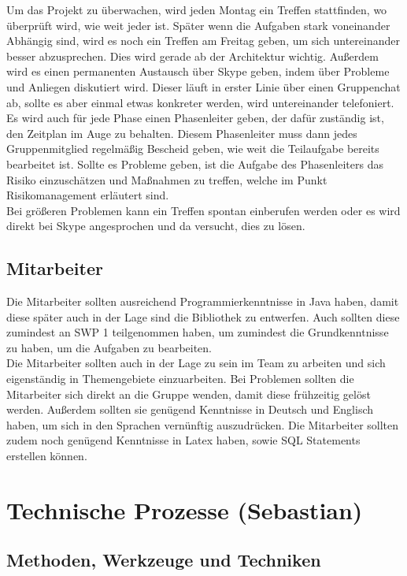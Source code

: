 \documentclass[fontsize=12pt,paper=a4,twoside]{scrartcl}
\begin{document}
Um das Projekt zu überwachen, wird jeden Montag ein Treffen stattfinden, wo überprüft wird, wie weit jeder ist. Später wenn die Aufgaben stark voneinander Abhängig sind, wird es noch ein Treffen am Freitag geben, um sich untereinander besser abzusprechen. Dies wird gerade ab der Architektur wichtig. Außerdem wird es einen permanenten Austausch über Skype geben, indem über Probleme und Anliegen diskutiert wird. Dieser läuft in erster Linie über einen Gruppenchat ab, sollte es aber einmal etwas konkreter werden, wird untereinander telefoniert. \\
Es wird auch für jede Phase einen Phasenleiter geben, der dafür zuständig ist, den Zeitplan im Auge zu behalten. Diesem Phasenleiter muss dann jedes Gruppenmitglied regelmäßig Bescheid geben, wie weit die Teilaufgabe bereits bearbeitet ist. Sollte es Probleme geben, ist die Aufgabe des Phasenleiters das Risiko einzuschätzen und Maßnahmen zu treffen, welche im Punkt Risikomanagement erläutert sind.\\
Bei größeren Problemen kann ein Treffen spontan einberufen werden oder es wird direkt bei Skype angesprochen und da versucht, dies zu lösen.

\subsection{Mitarbeiter}

Die Mitarbeiter sollten ausreichend Programmierkenntnisse in Java haben, damit diese später auch in der Lage sind die Bibliothek zu entwerfen. Auch sollten diese zumindest an SWP 1 teilgenommen haben, um zumindest die Grundkenntnisse zu haben, um die Aufgaben zu bearbeiten. \\
Die Mitarbeiter sollten auch in der Lage zu sein im Team zu arbeiten und sich eigenständig in Themengebiete einzuarbeiten. Bei Problemen sollten die Mitarbeiter sich direkt an die Gruppe wenden, damit diese frühzeitig gelöst werden. Außerdem sollten sie genügend Kenntnisse in Deutsch und Englisch haben, um sich in den Sprachen vernünftig auszudrücken. Die Mitarbeiter sollten zudem noch genügend Kenntnisse in Latex haben, sowie SQL Statements erstellen können. 


\section{Technische Prozesse (Sebastian)}
\subsection{Methoden, Werkzeuge und Techniken}
\end{document}
